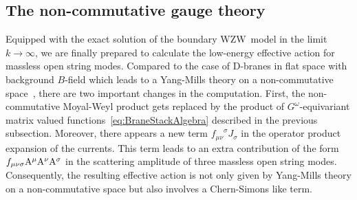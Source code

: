 \documentclass[12pt,a4paper]{article}
\def\iG{G^\omega} %
\def\tA{{\rm A}}
\begin{document}
\subsection{The non-commutative gauge theory}

Equipped with the exact solution of the boundary WZW~model in the
limit~$k\rightarrow\infty$, we are finally prepared to calculate 
the low-energy effective action for massless open string modes. 
Compared to the case of D-branes in flat space with background 
$B$-field which leads to a Yang-Mills theory on a non-commutative 
space~\cite{Seiberg:1999vs}, there are two important changes in 
the computation. First, the non-commutative Moyal-Weyl product 
gets replaced by the product of $\iG$-equivariant matrix valued 
functions~\eqref{eq:BraneStackAlgebra} described in the previous
subsection. Moreover, there appears a new term ${f_{\mu\nu}}^{\sigma} 
J_\sigma$ in the operator product expansion of the currents. This 
term leads to an extra contribution of the form  $f_{\mu\nu\sigma}
\tA^\mu\tA^\nu\tA^\sigma$ in the scattering amplitude of three 
massless open string modes. Consequently, the resulting effective 
action is not only given by Yang-Mills theory on a non-commutative space 
but also involves a Chern-Simons like term.%
\smallskip%
\end{document}
